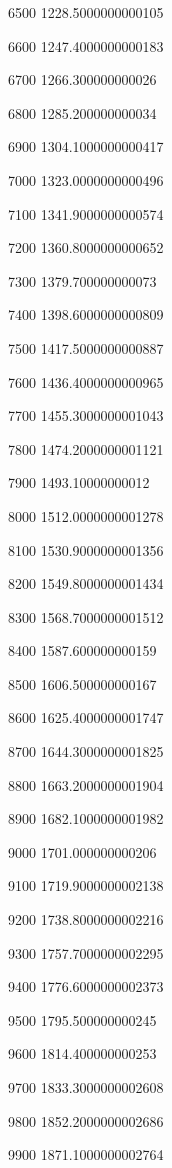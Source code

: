 \documentclass[a4paper, 12pt, oneside]{extarticle}
\begin{document}
\begin{longtable}[]
{6500 1228.5000000000105

6600 1247.4000000000183

6700 1266.300000000026

6800 1285.200000000034

6900 1304.1000000000417

7000 1323.0000000000496

7100 1341.9000000000574

7200 1360.8000000000652

7300 1379.700000000073

7400 1398.6000000000809

7500 1417.5000000000887

7600 1436.4000000000965

7700 1455.3000000001043

7800 1474.2000000001121

7900 1493.10000000012

8000 1512.0000000001278

8100 1530.9000000001356

8200 1549.8000000001434

8300 1568.7000000001512

8400 1587.600000000159

8500 1606.500000000167

8600 1625.4000000001747

8700 1644.3000000001825

8800 1663.2000000001904

8900 1682.1000000001982

9000 1701.000000000206

9100 1719.9000000002138

9200 1738.8000000002216

9300 1757.7000000002295

9400 1776.6000000002373

9500 1795.500000000245

9600 1814.400000000253

9700 1833.3000000002608

9800 1852.2000000002686

9900 1871.1000000002764} \\
\end{longtable}
\end{document}
